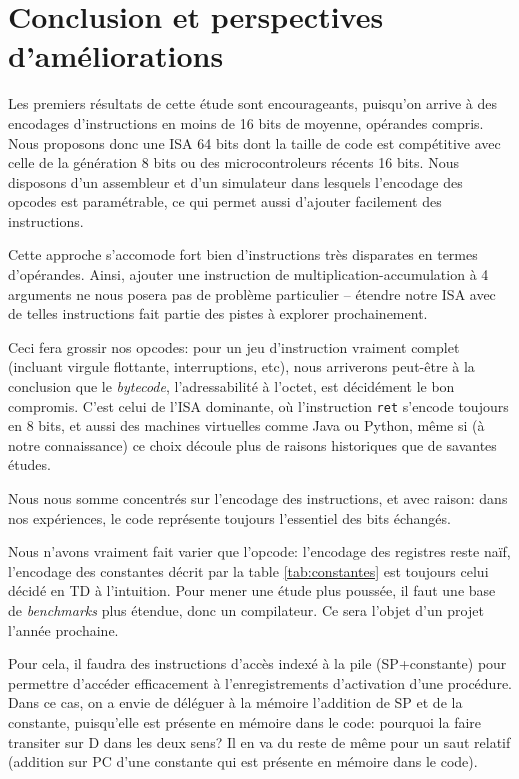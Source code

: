 \documentclass[architecture]{compas2018}
\begin{document}
\section{Conclusion et perspectives d'améliorations}

Les premiers résultats de cette étude sont encourageants, puisqu'on arrive à des encodages d'instructions en moins de 16 bits de moyenne, opérandes compris.
Nous proposons donc une ISA 64 bits dont la taille de code est compétitive avec celle de la génération 8 bits ou des microcontroleurs récents 16 bits.
Nous disposons d'un assembleur et d'un simulateur dans lesquels l'encodage des opcodes est paramétrable, ce qui permet aussi d'ajouter facilement des instructions.



Cette approche s'accomode fort bien d'instructions très disparates en termes d'opérandes.
Ainsi, ajouter une instruction de multiplication-accumulation à 4 arguments ne nous posera pas de problème particulier -- étendre notre ISA avec de telles instructions fait partie des pistes à explorer prochainement.

Ceci fera grossir nos opcodes: pour un jeu d'instruction vraiment complet (incluant virgule flottante, interruptions, etc), nous arriverons peut-être à la conclusion que le \emph{bytecode}, l'adressabilité à l'octet, est décidément le bon compromis.
C'est celui de l'ISA dominante, où l'instruction \texttt{ret} s'encode toujours en 8 bits, et aussi des machines virtuelles comme Java ou Python, même si (à notre connaissance) ce choix découle plus de  raisons historiques que de savantes études.

Nous nous somme concentrés sur l'encodage des instructions, et avec raison:  dans nos expériences, le code représente toujours l'essentiel des bits échangés.

Nous n'avons vraiment fait varier que l'opcode: l'encodage des registres reste naïf, l'encodage des constantes décrit par la table \ref{tab:constantes} est toujours celui décidé en TD à l'intuition.
Pour mener une étude plus poussée, il faut une base de \emph{benchmarks} plus étendue, donc un compilateur. Ce sera l'objet d'un projet l'année prochaine.

Pour cela, il faudra des instructions d'accès indexé à la pile (SP+constante) pour permettre d'accéder efficacement à l'enregistrements d'activation d'une procédure.
Dans ce cas,  on a envie de déléguer à la mémoire l'addition de SP et de la constante, puisqu'elle est  présente en mémoire dans le code: pourquoi la faire transiter sur D dans les deux sens?
Il en va du reste de même pour un saut relatif (addition sur PC d'une constante qui est présente en mémoire dans le code).
\end{document}
